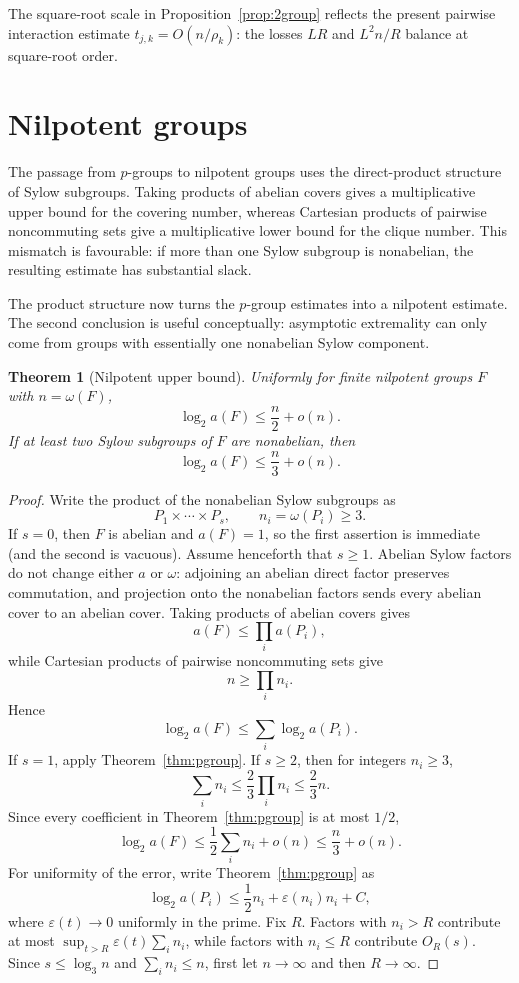 \documentclass[11pt]{article}
\newtheorem{theorem}{Theorem}[section]
\theoremstyle{definition}
\theoremstyle{remark}
\begin{document}
The square-root scale in Proposition~\ref{prop:2group} reflects the present pairwise interaction estimate $t_{j,k}=O(n/\rho_k)$: the losses $LR$ and $L^2n/R$ balance at square-root order.

\section{Nilpotent groups}

The passage from $p$-groups to nilpotent groups uses the direct-product structure of Sylow subgroups. Taking products of abelian covers gives a multiplicative upper bound for the covering number, whereas Cartesian products of pairwise noncommuting sets give a multiplicative lower bound for the clique number. This mismatch is favourable: if more than one Sylow subgroup is nonabelian, the resulting estimate has substantial slack.

The product structure now turns the $p$-group estimates into a nilpotent estimate. The second conclusion is useful conceptually: asymptotic extremality can only come from groups with essentially one nonabelian Sylow component.

\begin{theorem}[Nilpotent upper bound]\label{thm:nilpotent}
Uniformly for finite nilpotent groups $F$ with $n=\omega(F)$,
\[
\log_2a(F)\le\frac n2+o(n).
\]
If at least two Sylow subgroups of $F$ are nonabelian, then
\[
\log_2a(F)\le\frac n3+o(n).
\]
\end{theorem}

\begin{proof}
Write the product of the nonabelian Sylow subgroups as
\[
P_1\times\cdots\times P_s,\qquad n_i=\omega(P_i)\ge3.
\]
If $s=0$, then $F$ is abelian and $a(F)=1$, so the first assertion is immediate (and the second is vacuous). Assume henceforth that $s\ge1$. Abelian Sylow factors do not change either $a$ or $\omega$: adjoining an abelian direct factor preserves commutation, and projection onto the nonabelian factors sends every abelian cover to an abelian cover. Taking products of abelian covers gives
\[
a(F)\le\prod_i a(P_i),
\]
while Cartesian products of pairwise noncommuting sets give
\[
n\ge\prod_i n_i.
\]
Hence
\[
\log_2a(F)\le\sum_i\log_2a(P_i).
\]
If $s=1$, apply Theorem~\ref{thm:pgroup}. If $s\ge2$, then for integers $n_i\ge3$,
\[
\sum_i n_i\le\frac23\prod_i n_i\le\frac23n.
\]
Since every coefficient in Theorem~\ref{thm:pgroup} is at most $1/2$,
\[
\log_2a(F)\le\frac12\sum_i n_i+o(n)\le\frac n3+o(n).
\]
For uniformity of the error, write Theorem~\ref{thm:pgroup} as
\[
\log_2a(P_i)\le\frac12n_i+\varepsilon(n_i)n_i+C,
\]
where $\varepsilon(t)\to0$ uniformly in the prime. Fix $R$. Factors with $n_i>R$ contribute at most $\sup_{t>R}\varepsilon(t)\sum_i n_i$, while factors with $n_i\le R$ contribute $O_R(s)$. Since $s\le\log_3n$ and $\sum_i n_i\le n$, first let $n\to\infty$ and then $R\to\infty$.
\end{proof}
\end{document}
